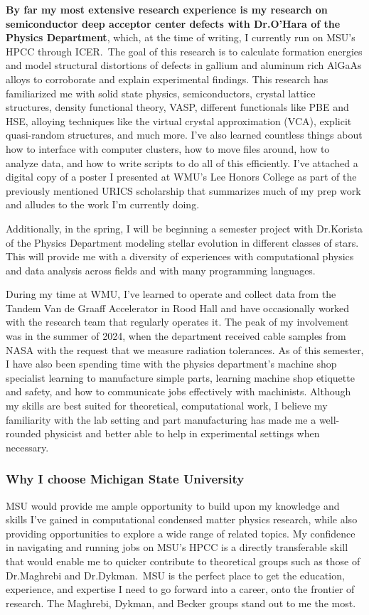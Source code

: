 \documentclass[11pt]{article}
\newcommand{\school}{Michigan State University}
\newcommand{\schoolabbr}{MSU}
\begin{document}
\textbf{By far my most extensive research experience is my research on semiconductor deep acceptor center defects with Dr.\@ O'Hara of the Physics Department}, which, at the time of writing, I currently run on MSU's HPCC through ICER.\ The goal of this research is to calculate formation energies and model structural distortions of defects in gallium and aluminum rich AlGaAs alloys to corroborate and explain experimental findings. This research has familiarized me with solid state physics, semiconductors, crystal lattice structures, density functional theory, VASP, different functionals like PBE and HSE, alloying techniques like the virtual crystal approximation (VCA), explicit quasi-random structures, and much more. I've also learned countless things about how to interface with computer clusters, how to move files around, how to analyze data, and how to write scripts to do all of this efficiently. I've attached a digital copy of a poster I presented at WMU's Lee Honors College as part of the previously mentioned URICS scholarship that summarizes much of my prep work and alludes to the work I'm currently doing.

Additionally, in the spring, I will be beginning a semester project with Dr.\@ Korista of the Physics Department modeling stellar evolution in different classes of stars. This will provide me with a diversity of experiences with computational physics and data analysis across fields and with many programming languages.

During my time at WMU, I've learned to operate and collect data from the Tandem Van de Graaff Accelerator in Rood Hall and have occasionally worked with the research team that regularly operates it. The peak of my involvement was in the summer of 2024, when the department received cable samples from NASA with the request that we measure radiation tolerances. As of this semester, I have also been spending time with the physics department's machine shop specialist learning to manufacture simple parts, learning machine shop etiquette and safety, and how to communicate jobs effectively with machinists. Although my skills are best suited for theoretical, computational work, I believe my familiarity with the lab setting and part manufacturing has made me a well-rounded physicist and better able to help in experimental settings when necessary.
\pagebreak

\phantom{}
\vspace{-5em}
\subsubsection*{Why I choose \school{}}
\schoolabbr{} would provide me ample opportunity to build upon my knowledge and skills I've gained in computational condensed matter physics research, while also providing opportunities to explore a wide range of related topics. My confidence in navigating and running jobs on MSU's HPCC is a directly transferable skill that would enable me to quicker contribute to theoretical groups such as those of Dr.\@ Maghrebi and Dr.\@ Dykman.\ \schoolabbr{} is the perfect place to get the education, experience, and expertise I need to go forward into a career, onto the frontier of research. The Maghrebi, Dykman, and Becker groups stand out to me the most.
\end{document}
